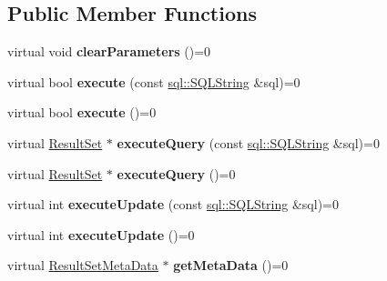 \subsection*{Public Member Functions}
\begin{DoxyCompactItemize}
\item 
\hypertarget{classsql_1_1_prepared_statement_ab9cb930a742cd46d3c4f7fb6be0ff4bb}{}\label{classsql_1_1_prepared_statement_ab9cb930a742cd46d3c4f7fb6be0ff4bb} 
virtual void {\bfseries clear\+Parameters} ()=0
\item 
\hypertarget{classsql_1_1_prepared_statement_a34cf6877fda80d5c1d4298c015d0ea20}{}\label{classsql_1_1_prepared_statement_a34cf6877fda80d5c1d4298c015d0ea20} 
virtual bool {\bfseries execute} (const \hyperlink{classsql_1_1_s_q_l_string}{sql\+::\+S\+Q\+L\+String} \&sql)=0
\item 
\hypertarget{classsql_1_1_prepared_statement_a51be3d86b9afad27ccad27fbc7cd5c4a}{}\label{classsql_1_1_prepared_statement_a51be3d86b9afad27ccad27fbc7cd5c4a} 
virtual bool {\bfseries execute} ()=0
\item 
\hypertarget{classsql_1_1_prepared_statement_a56f7e2fd6467bdac7de53eba2a1b0f5f}{}\label{classsql_1_1_prepared_statement_a56f7e2fd6467bdac7de53eba2a1b0f5f} 
virtual \hyperlink{classsql_1_1_result_set}{Result\+Set} $\ast$ {\bfseries execute\+Query} (const \hyperlink{classsql_1_1_s_q_l_string}{sql\+::\+S\+Q\+L\+String} \&sql)=0
\item 
\hypertarget{classsql_1_1_prepared_statement_a27b9ff4716c1272e90871002a69fef50}{}\label{classsql_1_1_prepared_statement_a27b9ff4716c1272e90871002a69fef50} 
virtual \hyperlink{classsql_1_1_result_set}{Result\+Set} $\ast$ {\bfseries execute\+Query} ()=0
\item 
\hypertarget{classsql_1_1_prepared_statement_a1ee399fbb48dcb8993313d6199063af5}{}\label{classsql_1_1_prepared_statement_a1ee399fbb48dcb8993313d6199063af5} 
virtual int {\bfseries execute\+Update} (const \hyperlink{classsql_1_1_s_q_l_string}{sql\+::\+S\+Q\+L\+String} \&sql)=0
\item 
\hypertarget{classsql_1_1_prepared_statement_a6c2c75f65f9e7a8c26e09e7c65708a36}{}\label{classsql_1_1_prepared_statement_a6c2c75f65f9e7a8c26e09e7c65708a36} 
virtual int {\bfseries execute\+Update} ()=0
\item 
\hypertarget{classsql_1_1_prepared_statement_ae8a9446542350e7f8f32765d341be334}{}\label{classsql_1_1_prepared_statement_ae8a9446542350e7f8f32765d341be334} 
virtual \hyperlink{classsql_1_1_result_set_meta_data}{Result\+Set\+Meta\+Data} $\ast$ {\bfseries get\+Meta\+Data} ()=0

\end{DoxyCompactItemize}
